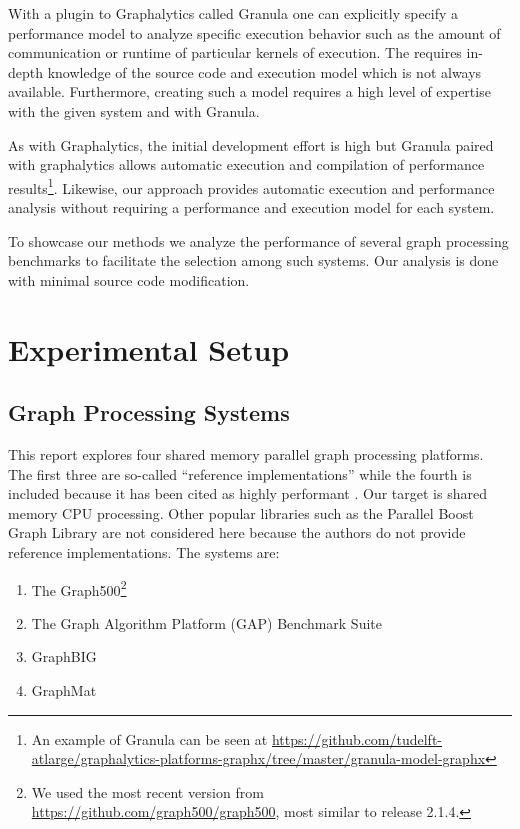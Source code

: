 \documentclass{llncs}
\begin{document}
With a plugin to Graphalytics called Granula \cite{Ngai:2015:Granula} one can explicitly specify a performance model to analyze specific execution behavior such as the amount of communication or runtime of particular kernels of execution. The requires in-depth knowledge of the source code and execution model which is not always available. Furthermore, creating such a model requires a high level of expertise with the given system and with Granula.

As with Graphalytics, the initial development effort is high but Granula paired with graphalytics allows automatic execution and compilation of performance results\footnote{An example of Granula can be seen at \url{https://github.com/tudelft-atlarge/graphalytics-platforms-graphx/tree/master/granula-model-graphx}}. Likewise, our approach provides automatic execution and performance analysis without requiring a performance and execution model for each system.

To showcase our methods we analyze the performance of several graph processing benchmarks to facilitate the selection among such systems. Our analysis is done with minimal source code modification.

\section{Experimental Setup}

\subsection{Graph Processing Systems}

This report explores four shared memory parallel graph processing platforms. The first three are so-called ``reference implementations'' while the fourth is included because it has been cited as highly performant \cite{Sundaram:2015:GraphMat}. Our target is shared memory CPU processing. Other popular libraries such as the Parallel Boost Graph Library \cite{Gregor:2005:PBGL} are not considered here because the authors do not provide reference implementations. The systems are:

\begin{enumerate}
	\item The Graph500\footnote{We used the most recent version from \url{https://github.com/graph500/graph500}, most similar to release 2.1.4.} \cite{Murphy:2010:Graph500}
	\item The Graph Algorithm Platform (GAP) Benchmark Suite \cite{Beamer:2015:GAPBench}
	\item GraphBIG \cite{Nai:2015:Graphbig}
	\item GraphMat \cite{Sundaram:2015:GraphMat}
\end{enumerate}
\end{document}
